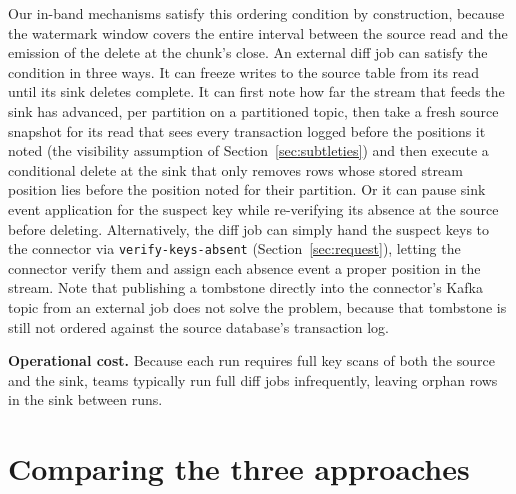 \documentclass[sigconf,nonacm,10pt]{acmart}
\begin{document}
Our in-band mechanisms satisfy this ordering condition by construction, because
the watermark window covers the entire interval between the source read and the
emission of the delete at the chunk's close. An external diff job can satisfy the condition in three ways. It can freeze
writes to the source table from its read until its sink deletes complete. It can
first note how far the stream that feeds the sink has advanced, per partition
on a partitioned topic, then take a fresh source snapshot for its read that sees every transaction
logged before the positions it noted (the visibility assumption of
Section~\ref{sec:subtleties}) and then execute a conditional delete at the
sink that only removes rows whose
stored stream position lies before the position noted for their partition. Or
it can pause sink event application for the suspect key while re-verifying its
absence at the source before deleting. Alternatively, the
diff job can simply hand the suspect keys to the connector via
\texttt{verify-keys-absent} (Section~\ref{sec:request}), letting the connector verify them and assign each absence event a proper
position in the stream.
Note that publishing a tombstone directly into the connector's Kafka topic from
an external job does not solve the problem, because that tombstone is still not
ordered against the source database's transaction log.

\textbf{Operational cost.} Because each run requires full key scans of both the
source and the sink, teams typically run full diff jobs infrequently, leaving
orphan rows in the sink between runs.

\section{Comparing the three approaches}\label{sec:compare}
\end{document}
